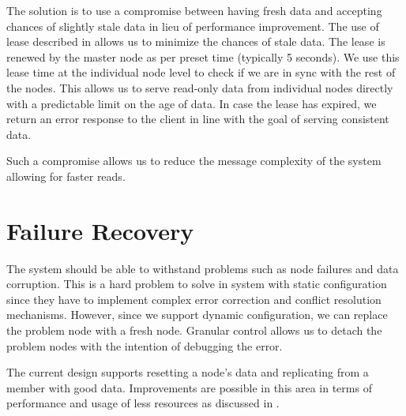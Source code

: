 The solution is to use a compromise between having fresh data and accepting
chances of slightly stale data in lieu of performance improvement. The
use of lease described in  allows us to minimize the
chances of stale data. The lease is renewed by the master node as per preset
time (typically 5 seconds). We use this lease time at the individual node level
to check if we are in sync with the rest of the nodes. This allows us to serve
read-only data from individual nodes directly with a predictable limit on the
age of data. In case the lease has expired, we return an error response to
the client in line with the goal of serving consistent data.

Such a compromise allows us to reduce the message complexity of the system
allowing for faster reads.

\section{Failure Recovery}

The system should be able to withstand problems such as node failures and data
corruption. This is a hard problem to solve in system with static configuration
since they have to implement complex error correction and conflict resolution
mechanisms. However, since we support dynamic configuration, we can replace
the problem node with a fresh node. Granular control allows us to detach the
problem nodes with the intention of debugging the error.

The current design supports resetting a node's data and replicating from
a member with good data. Improvements are possible in this area in terms of
performance and usage of less resources as discussed in
.

